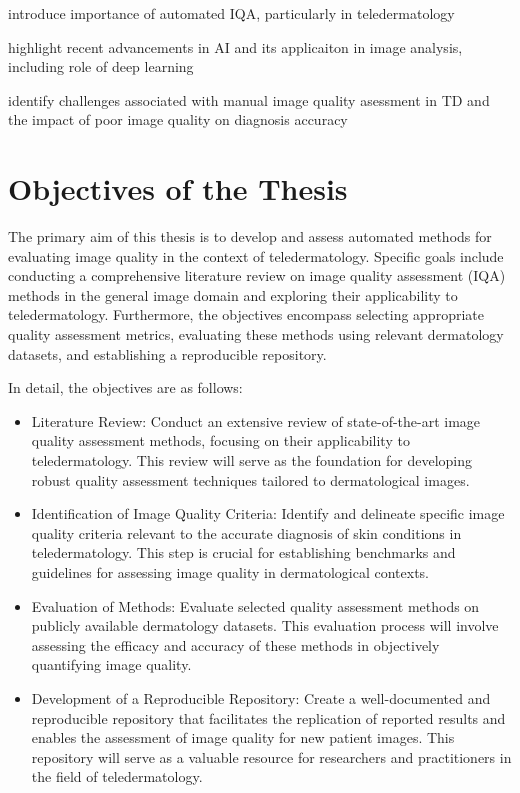 introduce importance of automated IQA, particularly in teledermatology \par 
highlight recent advancements in AI and its applicaiton in image analysis, including role of deep learning \par
identify challenges associated with manual image quality asessment in TD and the impact of poor image quality on diagnosis accuracy \par

\vspace{\baselineskip}
\noindent

\section{Objectives of the Thesis}
\label{sec:Objectives}
The primary aim of this thesis is to develop and assess automated methods for evaluating image quality in the context of teledermatology. Specific goals include conducting a comprehensive literature review on image quality assessment (IQA) methods in the general image domain and exploring their applicability to teledermatology. Furthermore, the objectives encompass selecting appropriate quality assessment metrics, evaluating these methods using relevant dermatology datasets, and establishing a reproducible repository. \par
\vspace{\baselineskip}
In detail, the objectives are as follows:
\begin{itemize}
    \item Literature Review: Conduct an extensive review of state-of-the-art image quality assessment methods, focusing on their applicability to teledermatology. This review will serve as the foundation for developing robust quality assessment techniques tailored to dermatological images.
    \item Identification of Image Quality Criteria: Identify and delineate specific image quality criteria relevant to the accurate diagnosis of skin conditions in teledermatology. This step is crucial for establishing benchmarks and guidelines for assessing image quality in dermatological contexts.
    \item Evaluation of Methods: Evaluate selected quality assessment methods on publicly available dermatology datasets. This evaluation process will involve assessing the efficacy and accuracy of these methods in objectively quantifying image quality.
    \item Development of a Reproducible Repository: Create a well-documented and reproducible repository that facilitates the replication of reported results and enables the assessment of image quality for new patient images. This repository will serve as a valuable resource for researchers and practitioners in the field of teledermatology.
\end{itemize}
